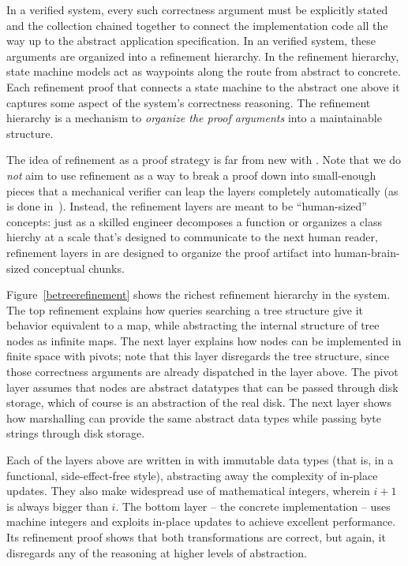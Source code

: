 In a verified system, every such correctness argument must be explicitly
stated and the collection chained together to connect the implementation
code all the way up to the abstract application specification.
In an {\ironstar} verified system, these arguments are organized into
a refinement hierarchy.
In the refinement hierarchy, state machine models act as waypoints
along the route from abstract to concrete. Each refinement proof that
connects a state machine to the abstract one above it captures some
aspect of the system's correctness reasoning. 
The refinement hierarchy is a mechanism to \textit{organize the
proof arguments} into a maintainable structure.


The idea of refinement as a proof strategy is far from new with {\ironstar}.
Note that we do \textit{not} aim to use refinement
as a way to break a proof down into small-enough pieces that a
mechanical verifier can leap the layers completely automatically
(as is done in~\cite{cspec,ironarmada}).
Instead, the refinement layers are meant to be ``human-sized'' concepts:
just as a skilled engineer decomposes a function or organizes a
class hierchy at a scale that's designed to communicate to the next
human reader,
refinement layers in {\ironstar} are designed to organize the proof
artifact into human-brain-sized conceptual chunks.

Figure~\ref{betreerefinement} shows the richest refinement hierarchy in the
{\veribetrfs} system.
The top refinement explains how queries searching a {\bepsilon}tree
structure give it behavior equivalent to a map,
while abstracting the internal structure of tree nodes as infinite
maps.
The next layer explains how nodes can be implemented in finite space
with pivots; note that this layer disregards the {\bepsilon}tree structure,
since those correctness arguments are already dispatched in the
layer above.
The pivot layer assumes that nodes are abstract datatypes that can
be passed through disk storage, which of course is an abstraction of
the real disk. The next layer shows how marshalling can provide the
same abstract data types while passing byte strings through disk storage.

Each of the layers above are written in with immutable data types
(that is, in a functional, side-effect-free style), abstracting away
the complexity of in-place updates. They also make widespread use of
mathematical integers, wherein $i+1$ is always bigger than $i$.
The bottom layer -- the concrete implementation -- uses machine integers
and exploits in-place updates to achieve excellent performance.
Its refinement proof shows that both transformations are correct,
but again, it disregards any of the reasoning at higher levels of
abstraction.

